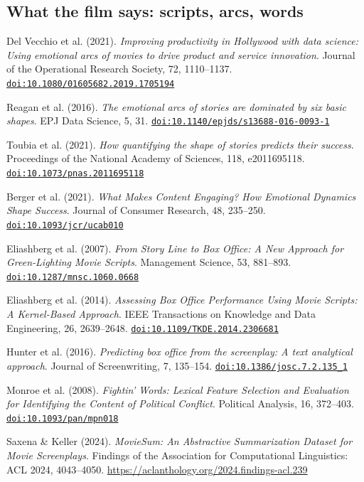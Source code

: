 \subsection{What the film says: scripts, arcs, words}
\begin{enumerate}[label={[\arabic*]},start=12,leftmargin=2.2em,itemsep=2pt]
\item Del Vecchio et al. (2021). \textit{Improving productivity in {Hollywood} with data science: Using emotional arcs of movies to drive product and service innovation}. Journal of the Operational Research Society, 72, 1110--1137. \href{https://doi.org/10.1080/01605682.2019.1705194}{\nolinkurl{doi:10.1080/01605682.2019.1705194}} 
\item Reagan et al. (2016). \textit{The emotional arcs of stories are dominated by six basic shapes}. EPJ Data Science, 5, 31. \href{https://doi.org/10.1140/epjds/s13688-016-0093-1}{\nolinkurl{doi:10.1140/epjds/s13688-016-0093-1}} 
\item Toubia et al. (2021). \textit{How quantifying the shape of stories predicts their success}. Proceedings of the National Academy of Sciences, 118, e2011695118. \href{https://doi.org/10.1073/pnas.2011695118}{\nolinkurl{doi:10.1073/pnas.2011695118}} 
\item Berger et al. (2021). \textit{What Makes Content Engaging? How Emotional Dynamics Shape Success}. Journal of Consumer Research, 48, 235--250. \href{https://doi.org/10.1093/jcr/ucab010}{\nolinkurl{doi:10.1093/jcr/ucab010}} 
\item Eliashberg et al. (2007). \textit{From Story Line to Box Office: A New Approach for Green-Lighting Movie Scripts}. Management Science, 53, 881--893. \href{https://doi.org/10.1287/mnsc.1060.0668}{\nolinkurl{doi:10.1287/mnsc.1060.0668}} 
\item Eliashberg et al. (2014). \textit{Assessing Box Office Performance Using Movie Scripts: A Kernel-Based Approach}. IEEE Transactions on Knowledge and Data Engineering, 26, 2639--2648. \href{https://doi.org/10.1109/TKDE.2014.2306681}{\nolinkurl{doi:10.1109/TKDE.2014.2306681}} 
\item Hunter et al. (2016). \textit{Predicting box office from the screenplay: A text analytical approach}. Journal of Screenwriting, 7, 135--154. \href{https://doi.org/10.1386/josc.7.2.135_1}{\nolinkurl{doi:10.1386/josc.7.2.135_1}} 
\item Monroe et al. (2008). \textit{Fightin' Words: Lexical Feature Selection and Evaluation for Identifying the Content of Political Conflict}. Political Analysis, 16, 372--403. \href{https://doi.org/10.1093/pan/mpn018}{\nolinkurl{doi:10.1093/pan/mpn018}} 
\item Saxena \& Keller (2024). \textit{{MovieSum}: An Abstractive Summarization Dataset for Movie Screenplays}. Findings of the Association for Computational Linguistics: ACL 2024, 4043--4050. \url{https://aclanthology.org/2024.findings-acl.239} 
\end{enumerate}
